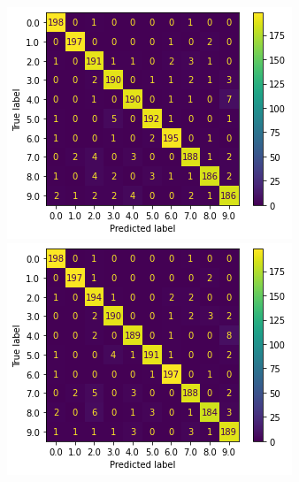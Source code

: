 \documentclass{article}
\begin{document}
\begin{figure}[!htb]
  \includegraphics[width=\linewidth]{figure/ksvm_cm.png}
\endminipage\hfill
{}
  \includegraphics[width=\linewidth]{figure/ksvm_pca_cm.png}
\endminipage\hfill
{}

\end{figure}
\end{document}
